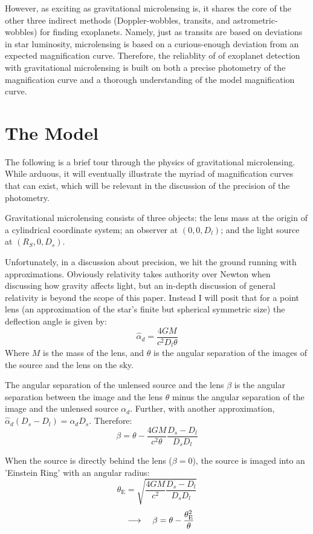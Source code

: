 \documentclass[12pt, a4paper, twocolumn]{article}
\newcommand{\arr}{\ensuremath{\longrightarrow\ }}
\begin{document}
However, as exciting as gravitational microlensing is, it shares the core of the other three indirect methods (Doppler-wobbles, transits, and astrometric-wobbles) for finding exoplanets.
Namely, just as transits are based on deviations in star luminosity,
microlensing is based on a curious-enough deviation from an expected magnification curve.
Therefore, the reliablity of of exoplanet detection with gravitational microlensing is built on both a precise photometry of the magnification curve and a thorough understanding of the model magnification curve.

\section{The Model}

The following is a brief tour through the physics of gravitational microlensing.
While arduous, it will eventually illustrate the myriad of magnification curves that can exist, which will be relevant in the discussion of the precision of the photometry.

Gravitational microlensing consists of three objects: the lens mass at the origin of a cylindrical coordinate system;
an observer at $(0,0,D_l)$; and the light source at $(R_S,0,D_s)$.

Unfortunately, in a discussion about precision, we hit the ground running with approximations.
Obviously  relativity takes authority over Newton when discussing how gravity affects light, but an in-depth discussion of general relativity is beyond the scope of this paper.
Instead I will posit that for a point lens (an approximation of the star's finite but spherical symmetric size) the deflection angle is given by:
\[\hat \alpha _d = \frac{4GM}{c^2D_l\theta}\]
Where $M$ is the mass of the lens, and $\theta$ is the angular separation of the images of the source and the lens on the sky.\cite{gl_princ, gaudi}

The angular separation of the unlensed source and the lens $\beta$ is the angular separation between the image and the lens $\theta$ minus the angular separation of the image and the unlensed source $\alpha _d$. Further, with another approximation, $\hat \alpha _d(D_s-D_l)= \alpha _d D_s$. Therefore:
\[\label{eq1} \beta = \theta-\frac{4GM}{c^2\theta}\frac{D_s-D_l}{D_sD_l}\]

When the source is directly behind the lens ($\beta =0$), the source is imaged into an 'Einstein Ring'
\cite{gaudi}
with an angular radius:
\[\theta _\mathrm E =
\sqrt{\frac{4GM}{c^2}\frac{D_s-D_l}{D_sD_l}}
\]
\begin{equation}\label{eq1r}
\qq{\arr} \beta = \theta - \frac{\theta _\mathrm E^2}{\theta}
\end{equation}
\end{document}
